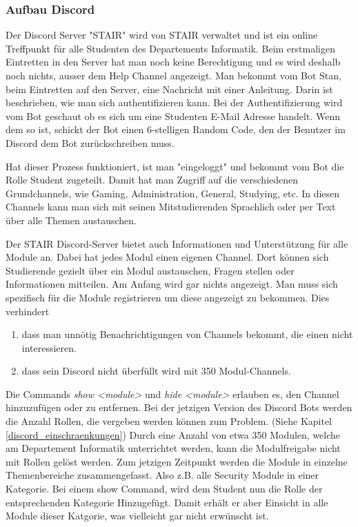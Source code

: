 \documentclass[a4paper, table]{article}
\begin{document}
\subsubsection{Aufbau Discord}
Der Discord Server "STAIR" wird von STAIR verwaltet und ist ein online Treffpunkt f\"ur alle Studenten des Departements Informatik.
Beim erstmaligen Eintretten in den Server hat man noch keine Berechtigung und es wird deshalb noch nichts, ausser dem Help Channel
angezeigt. Man bekommt vom Bot Stan, beim Eintretten auf den Server, eine Nachricht mit einer Anleitung. Darin ist beschrieben, wie
man sich authentifizieren kann. Bei der Authentifizierung wird vom Bot geschaut ob es sich um eine Studenten E-Mail Adresse handelt.
Wenn dem so ist, schickt der Bot einen 6-stelligen Random Code, den der Benutzer im Discord dem Bot zur\"uckschreiben muss.

Hat dieser Prozess funktioniert, ist man "eingeloggt" und bekommt vom Bot die Rolle Student zugeteilt. Damit hat man Zugriff auf
die verschiedenen Grundchannels, wie Gaming, Administration, General, Studying, etc.
In diesen Channels kann man sich mit seinen Mitstudierenden Sprachlich oder per Text \"uber alle Themen austauschen.
\newline

Der STAIR Discord-Server bietet auch Informationen und Unterst\"utzung f\"ur alle Module an. Dabei hat jedes Modul einen eigenen Channel.
Dort k\"onnen sich Studierende gezielt \"uber ein Modul austauschen, Fragen stellen oder Informationen mitteilen.
Am Anfang wird gar nichts angezeigt. Man muss sich spezifisch f\"ur die Module registrieren um diese angezeigt zu bekommen. Dies verhindert

\begin{enumerate}
    \item dass man unn\"otig Benachrichtigungen von Channels bekommt, die einen nicht interessieren.
    \item dass sein Discord nicht \"uberf\"ullt wird mit 350 Modul-Channels.
\end{enumerate}

Die Commands \textit{show <module>} und \textit{hide <module>} erlauben es, den Channel hinzuzuf\"ugen oder zu entfernen.
Bei der jetzigen Version des Discord Bots werden die Anzahl Rollen, die vergeben werden können zum Problem.
(Siehe Kapitel \ref{discord_einschraenkungen})
Durch eine Anzahl von etwa 350 Modulen, welche am Departement Informatik unterrichtet werden, 
kann die Modulfreigabe nicht mit Rollen gelöst werden.
Zum jetzigen Zeitpunkt werden die Module in einzelne Themenbereiche zusammengefasst.
Also z.B. alle Security Module in einer Kategorie.
Bei einem show Command, wird dem Student nun die Rolle der entsprechenden Kategorie Hinzugefügt.
Damit erhält er aber Einsicht in alle Module dieser Katgorie, was vielleicht gar nicht erwünscht ist.
\newline
\end{document}
